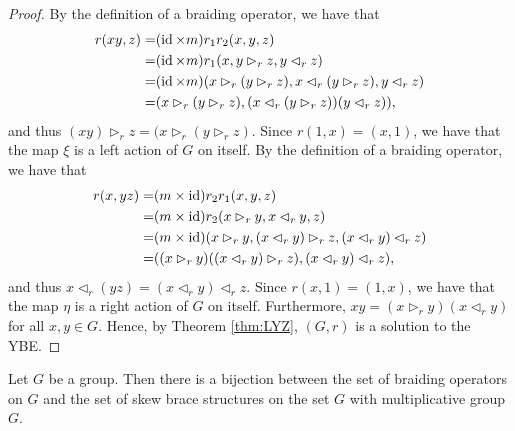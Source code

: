 \begin{proof}
By the definition of a braiding operator, we have that
    \begin{align*}
        r(xy,z)=& (\operatorname{id}\times m)r_1r_2(x,y,z)\\
        =&(\operatorname{id}\times m)r_1(x,y\rhd_r z,y\lhd_r z)\\
        =&(\operatorname{id}\times m)(x\rhd_r (y\rhd_r z),x\lhd_r (y\rhd_r z),y\lhd_r z)\\
        =&(x\rhd_r (y\rhd_r z),(x\lhd_r (y\rhd_r z))(y\lhd_r z)),
        \end{align*}
    and thus $(xy)\rhd_r z=(x\rhd_r (y\rhd_r z)$. Since $r(1,x)=(x,1)$, we have that the map $\xi$ is a left action of $G$ on itself.
    By the definition of a braiding operator, we have that
    \begin{align}\label{LYZequa1}
        r(x,yz)=& (m\times\operatorname{id})r_2r_1(x,y,z)\nonumber\\
        =&(m\times\operatorname{id})r_2(x\rhd_r y,x\lhd_r y,z)\nonumber\\
        =&(m\times\operatorname{id})(x\rhd_r y,(x\lhd_r y)\rhd_r z, (x\lhd_r y)\lhd_r z)\nonumber\\
        =&((x\rhd_r y)((x\lhd_r y)\rhd_r z), (x\lhd_r y)\lhd_r z),
        \end{align}
    and thus $x\lhd_r (yz)=(x\lhd_r y)\lhd_r z$. Since $r(x,1)=(1,x)$, we have that the map $\eta$ is a right action of $G$ on itself. Furthermore, $xy=(x\rhd_r y)(x\lhd_r y)$ for all $x,y\in G$. Hence, by Theorem \ref{thm:LYZ}, $(G,r)$ is a solution to the YBE.
\end{proof}

\begin{theorem}\label{thm:braidedbraces}
    Let $G$ be a group. Then there is a bijection between the set of braiding operators on $G$ and the set of skew brace structures on the set $G$ with multiplicative group $G$. 
\end{theorem}

